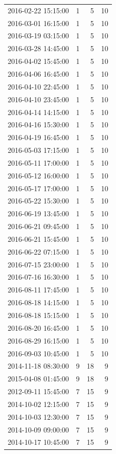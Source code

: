 \begin{tabular}{lrrr}
2016-02-22 15:15:00 & 1 & 5 & 10 \\
2016-03-01 16:15:00 & 1 & 5 & 10 \\
2016-03-19 03:15:00 & 1 & 5 & 10 \\
2016-03-28 14:45:00 & 1 & 5 & 10 \\
2016-04-02 15:45:00 & 1 & 5 & 10 \\
2016-04-06 16:45:00 & 1 & 5 & 10 \\
2016-04-10 22:45:00 & 1 & 5 & 10 \\
2016-04-10 23:45:00 & 1 & 5 & 10 \\
2016-04-14 14:15:00 & 1 & 5 & 10 \\
2016-04-16 15:30:00 & 1 & 5 & 10 \\
2016-04-19 16:45:00 & 1 & 5 & 10 \\
2016-05-03 17:15:00 & 1 & 5 & 10 \\
2016-05-11 17:00:00 & 1 & 5 & 10 \\
2016-05-12 16:00:00 & 1 & 5 & 10 \\
2016-05-17 17:00:00 & 1 & 5 & 10 \\
2016-05-22 15:30:00 & 1 & 5 & 10 \\
2016-06-19 13:45:00 & 1 & 5 & 10 \\
2016-06-21 09:45:00 & 1 & 5 & 10 \\
2016-06-21 15:45:00 & 1 & 5 & 10 \\
2016-06-22 07:15:00 & 1 & 5 & 10 \\
2016-07-15 23:00:00 & 1 & 5 & 10 \\
2016-07-16 16:30:00 & 1 & 5 & 10 \\
2016-08-11 17:45:00 & 1 & 5 & 10 \\
2016-08-18 14:15:00 & 1 & 5 & 10 \\
2016-08-18 15:15:00 & 1 & 5 & 10 \\
2016-08-20 16:45:00 & 1 & 5 & 10 \\
2016-08-29 16:15:00 & 1 & 5 & 10 \\
2016-09-03 10:45:00 & 1 & 5 & 10 \\
2014-11-18 08:30:00 & 9 & 18 & 9 \\
2015-04-08 01:45:00 & 9 & 18 & 9 \\
2012-09-11 15:45:00 & 7 & 15 & 9 \\
2014-10-02 12:15:00 & 7 & 15 & 9 \\
2014-10-03 12:30:00 & 7 & 15 & 9 \\
2014-10-09 09:00:00 & 7 & 15 & 9 \\
2014-10-17 10:45:00 & 7 & 15 & 9 \\

\end{tabular}
